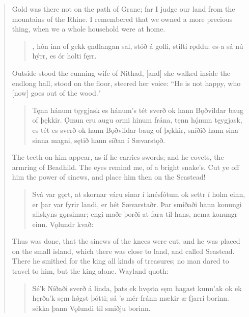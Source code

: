 \begin{verse}
\bvb Gold was there not on the path of Grane; far I judge our land from the mountains of the Rhine. I remembered that we owned a more precious thing, when we a whole household were at home.

\begin{verse}
,
hón inn of gekk \hld ęndlangan sal,
stóð á golfi, \hld stilti rǫddu:
es-a sá nú hýrr, \hld es ór holti fęrr. \\%
\end{verse}

\bvb Outside stood the cunning wife of Nithad, [and] she walked inside the endlong hall, stood on the floor, steered her voice: “He is not happy, who [now] goes out of the wood."

\begin{verse}
\bva Tęnn hánum tęygjask \hld es hánum's tét sverð
ok hann Bǫðvildar \hld baug of þękkir.
Ǫ́mun eru augu \hld ormi hinum frána,
tęnn hǫ́num tęygjask, \hld es tét es sverð
ok hann Bǫðvildar \hld baug of þękkir,
sníðið hann sina \hld sinna magni,
sętið hann síðan \hld í Sævarstǫð. \\%
\end{verse}

\bvb The teeth on him appear, as if he carries swords; and he covets, the armring of Beadhild. The eyes remind me, of a bright snake's. Cut ye off him the power of sinews, and place him then on the Seastead!

\begin{verse}
\bva Svá var gǫrt, at skornar váru sinar í knésfótum ok settr í holm einn, er þar var fyrir landi, er hét Sævarstaðr. Þar smíðaði hann konungi allskyns gǫrsimar; engi maðr þorði at fara til hans, nema konungr einn. Vǫlundr kvað: \\%
\end{verse}

\bvb Thus was done, that the sinews of the knees were cut, and he was placed on the small island, which there was close to land, and called Seastead. There he smithed for the king all kinds of treasures; no man dared to travel to him, but the king alone. Wayland quoth: \\

\begin{verse}
\bva Sé'k Níðaði \hld sverð á linda,
þats ek hvęsta \hld sęm hagast kunn'ak
ok ek hęrða'k \hld sęm hǿgst þótti;
sá 's mér fránn mækir \hld æ fjarri borinn.
sékka þann Vǫlundi \hld til smiðju borinn. \\%
\end{verse}


\end{verse}
